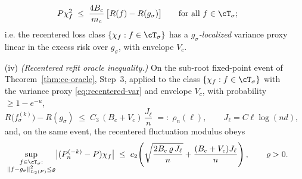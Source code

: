 \begin{lemma}
\begin{enumerate}
  \begin{equation}\label{eq:recentered-var}
    P\chi_f^2\;\le\; \frac{4B_c}{m_c}\,\bigl[R(f)-R(g_\sigma)\bigr]
    \qquad\text{for all } f\in\cT_\sigma;
  \end{equation}
  i.e. the recentered loss class $\{\chi_f:f\in\cT_\sigma\}$ has a
  \emph{$g_\sigma$-localized} variance proxy linear in the excess risk over
  $g_\sigma$, with envelope $V_c$.
\item[(iv)] \emph{(Recentered refit oracle inequality.)} On the sub-root
  fixed-point event of Theorem~\ref{thm:ce-oracle}, Step~3, applied to the class
  $\{\chi_f:f\in\cT_\sigma\}$ with the variance proxy \eqref{eq:recentered-var}
  and envelope $V_c$, with probability $\ge 1-e^{-u}$,
  \begin{equation}\label{eq:refit-excess}
    R\bigl(f_\sigma^{(k)}\bigr) - R(g_\sigma)
    \;\le\; C_3\,(B_c+V_c)\,\frac{J_\ell}{n}
    \;=:\; \rho_n(\ell),
    \qquad J_\ell=C\ell\log(nd),
  \end{equation}
  and, on the same event, the recentered fluctuation modulus obeys
  \begin{equation}\label{eq:diff-modulus}
    \sup_{\substack{f\in\cT_\sigma:\\ \|f-g_\sigma\|_{L_2(P)}^2\le\varrho}}
       \bigl|(P_n^{(-k)}-P)\chi_f\bigr|
    \;\le\; c_2\!\left(\sqrt{\frac{2B_c\,\varrho\,J_\ell}{n}}
        + \frac{(B_c+V_c)J_\ell}{n}\right),
    \qquad \varrho>0.
  \end{equation}
\end{enumerate}
\end{lemma}

